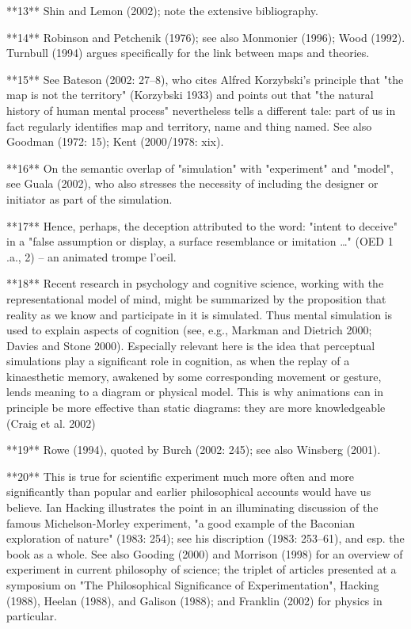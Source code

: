 **13** Shin and Lemon (2002); note the extensive bibliography.

**14** Robinson and Petchenik (1976); see also Monmonier (1996); Wood (1992). Turnbull (1994) argues specifically for the link between maps and theories.

**15** See Bateson (2002: 27–8), who cites Alfred Korzybski's principle that "the map is not the territory" (Korzybski 1933) and points out that "the natural history of human mental process" nevertheless tells a different tale: part of us in fact regularly identifies map and territory, name and thing named. See also Goodman (1972: 15); Kent (2000/1978: xix).

**16** On the semantic overlap of "simulation" with "experiment" and "model", see Guala (2002), who also stresses the necessity of including the designer or initiator as part of the simulation.

**17** Hence, perhaps, the deception attributed to the word: "intent to deceive" in a "false assumption or display, a surface resemblance or imitation …" (OED 1 .a., 2) – an animated trompe l'oeil.

**18** Recent research in psychology and cognitive science, working with the representational model of mind, might be summarized by the proposition that reality as we know and participate in it is simulated. Thus mental simulation is used to explain aspects of cognition (see, e.g., Markman and Dietrich 2000; Davies and Stone 2000). Especially relevant here is the idea that perceptual simulations play a significant role in cognition, as when the replay of a kinaesthetic memory, awakened by some corresponding movement or gesture, lends meaning to a diagram or physical model. This is why animations can in principle be more effective than static diagrams: they are more knowledgeable (Craig et al. 2002)

**19** Rowe (1994), quoted by Burch (2002: 245); see also Winsberg (2001).

**20** This is true for scientific experiment much more often and more significantly than popular and earlier philosophical accounts would have us believe. Ian Hacking illustrates the point in an illuminating discussion of the famous Michelson-Morley experiment, "a good example of the Baconian exploration of nature" (1983: 254); see his discription (1983: 253–61), and esp. the book as a whole. See also Gooding (2000) and Morrison (1998) for an overview of experiment in current philosophy of science; the triplet of articles presented at a symposium on "The Philosophical Significance of Experimentation", Hacking (1988), Heelan (1988), and Galison (1988); and Franklin (2002) for physics in particular.


